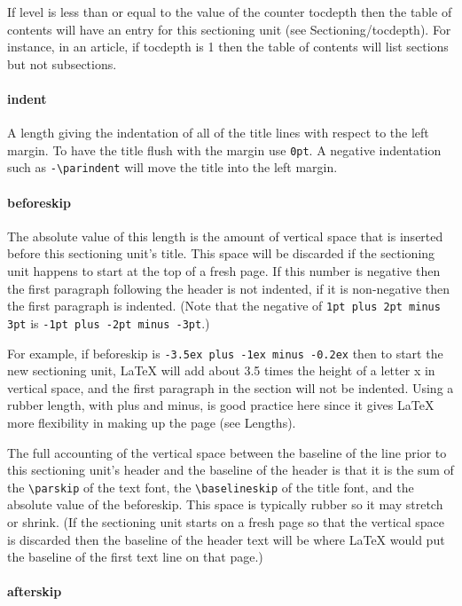 If level is less than or equal to the value of the counter tocdepth then the table of contents will have an entry for this sectioning unit (see Sectioning/tocdepth). For instance, in an article, if tocdepth is 1 then the table of contents will list sections but not subsections.

\paragraph{indent}

A length giving the indentation of all of the title lines with respect to the
left margin. To have the title flush with the margin use \verb|0pt|. A negative
indentation such as \verb|-\parindent| will move the title into the left margin.

\paragraph{beforeskip}

The absolute value of this length is the amount of vertical space that is
inserted before this sectioning unit’s title. This space will be discarded if
the sectioning unit happens to start at the top of a fresh page. If this number
is negative then the first paragraph following the header is not indented, if
it is non-negative then the first paragraph is indented. (Note that the
negative of \verb|1pt plus 2pt minus 3pt| is \verb|-1pt plus -2pt minus -3pt|.)

For example, if beforeskip is \verb|-3.5ex plus -1ex minus -0.2ex| then to start
the new sectioning unit, LaTeX will add about 3.5 times the height of a
letter x in vertical space, and the first paragraph in the section will not
be indented. Using a rubber length, with plus and minus, is good practice
here since it gives LaTeX more flexibility in making up the page (see
Lengths).

The full accounting of the vertical space between the baseline of the line
prior to this sectioning unit’s header and the baseline of the header is
that it is the sum of the \verb|\parskip| of the text font, the \verb|\baselineskip| of
the title font, and the absolute value of the beforeskip. This space is
typically rubber so it may stretch or shrink. (If the sectioning unit
starts on a fresh page so that the vertical space is discarded then the
baseline of the header text will be where LaTeX would put the baseline of
the first text line on that page.)

\paragraph{afterskip}

